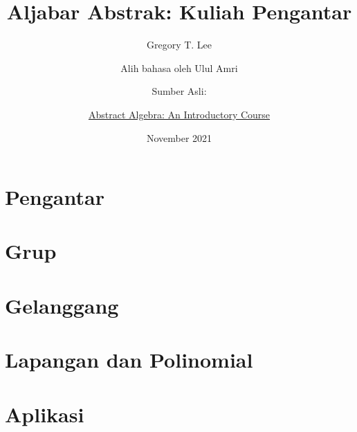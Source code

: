 \documentclass{amsbook}
\title{Aljabar Abstrak: Kuliah Pengantar}
\author{Gregory T. Lee}
\author{Alih bahasa oleh Ulul Amri}
\author{Sumber Asli:}
\author{\href{https://doi.org/10.1007/978-3-319-77649-1}{Abstract Algebra: An Introductory Course}}
\date{November 2021}
\theoremstyle{definition}
\theoremstyle{remark}
\theoremstyle{plain}
\theoremstyle{exercise}
\begin{document}
\maketitle


\part{Pengantar}



\part{Grup}






\part{Gelanggang}




\part{Lapangan dan Polinomial}



\part{Aplikasi}


\end{document}
